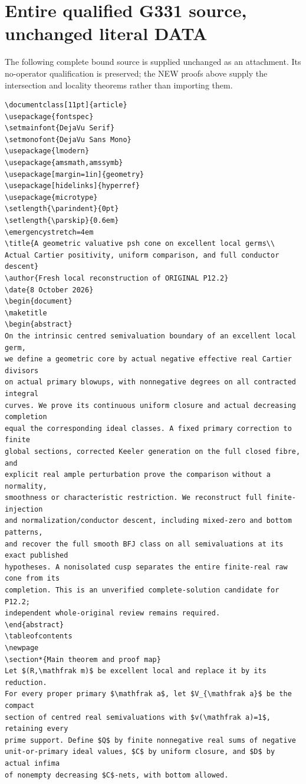\documentclass[11pt]{article}
\begin{document}
\section{Entire qualified G331 source, unchanged literal DATA}
The following complete bound source is supplied unchanged as an attachment.
Its no-operator qualification is preserved; the NEW proofs above supply the
intersection and locality theorems rather than importing them.
\begin{Verbatim}[breaklines,fontsize=\tiny]
\documentclass[11pt]{article}
\usepackage{fontspec}
\setmainfont{DejaVu Serif}
\setmonofont{DejaVu Sans Mono}
\usepackage{lmodern}
\usepackage{amsmath,amssymb}
\usepackage[margin=1in]{geometry}
\usepackage[hidelinks]{hyperref}
\usepackage{microtype}
\setlength{\parindent}{0pt}
\setlength{\parskip}{0.6em}
\emergencystretch=4em
\title{A geometric valuative psh cone on excellent local germs\\
Actual Cartier positivity, uniform comparison, and full conductor descent}
\author{Fresh local reconstruction of ORIGINAL P12.2}
\date{8 October 2026}
\begin{document}
\maketitle
\begin{abstract}
On the intrinsic centred semivaluation boundary of an excellent local germ,
we define a geometric core by actual negative effective real Cartier divisors
on actual primary blowups, with nonnegative degrees on all contracted integral
curves. We prove its continuous uniform closure and actual decreasing completion
equal the corresponding ideal classes. A fixed primary correction to finite
global sections, corrected Keeler generation on the full closed fibre, and
explicit real ample perturbation prove the comparison without a normality,
smoothness or characteristic restriction. We reconstruct full finite-injection
and normalization/conductor descent, including mixed-zero and bottom patterns,
and recover the full smooth BFJ class on all semivaluations at its exact published
hypotheses. A nonisolated cusp separates the entire finite-real raw cone from its
completion. This is an unverified complete-solution candidate for P12.2;
independent whole-original review remains required.
\end{abstract}
\tableofcontents
\newpage
\section*{Main theorem and proof map}
Let $(R,\mathfrak m)$ be excellent local and replace it by its reduction.
For every proper primary $\mathfrak a$, let $V_{\mathfrak a}$ be the compact
section of centred real semivaluations with $v(\mathfrak a)=1$, retaining every
prime support. Define $Q$ by finite nonnegative real sums of negative
unit-or-primary ideal values, $C$ by uniform closure, and $D$ by actual infima
of nonempty decreasing $C$-nets, with bottom allowed.


\end{Verbatim}
\end{document}
